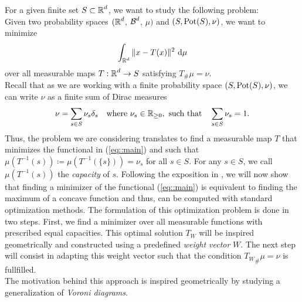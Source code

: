 \documentclass[
     12pt,         %
     a4paper,      %
     BCOR=10mm,     %
     DIV=14,        %
     ]{scrreprt}
\begin{document}
    

    For a given finite set $S \subset \operatorname{\mathbb{R}}^d$, we want to study the following problem: \\ 
    Given two probability spaces $(\operatorname{\mathbb{R}}^d$, $\operatorname{\mathcal{B}}^d$, $\mu)$ and $(S, \operatorname{Pot}(S), \nu)$, we want to minimize 
    \begin{align} \label{eq::main}
        \int_{\operatorname{\mathbb{R}}^d} \|x-T(x) \|^2 \ {\operatorname{{\mathrm{d}}}} \mu  
    \end{align}
    over all measurable maps $T: \operatorname{\mathbb{R}}^d \to S$ satisfying $T_{\#}\mu = \nu$. \\%
    Recall that as we are working with a finite probability space $(S, \operatorname{Pot}(S), \nu)$, we can write $\nu$ as a finite sum of Dirac measures
    \begin{align} \label{eq::dirac} 
        \nu = \sum_{s\in S} {\nu_s \delta_{s}} \quad \text{where   } \nu_s \in \operatorname{\mathbb{R}}_{\ge 0}, \text{    such that} \quad \sum_{s \in S}{\nu_s} = 1. 
    \end{align}
    Thus, the problem we are considering translates to find a measurable map $T$ that minimizes the functional in (\ref{eq::main}) and such that 
    $\mu(T^{-1}(s)) \coloneqq \mu(T^{-1}(\{s\})) = \nu_s $  for all $s\in S$. For any $s\in S$, we call $\mu(T^{-1}(s))$  the \textit{capacity} of $s$.
    Following the exposition in \cite{aurenhammer1998minkowski}, we will now show that finding a minimizer of the functional (\ref{eq::main}) is equivalent to finding the maximum of a concave function and
    thus, can be computed with standard optimization methods. The formulation of this optimization problem is done in two steps. 
    First, we find a minimizer over all measurable functions with prescribed equal capacities. This optimal solution $T_W$ will be inspired geometrically and constructed using 
    a predefined \textit{weight vector}  $W$.
    The next step will consist in adapting this weight vector such that the condition ${T_{W}}_{\#}\mu = \nu$ is fullfilled.\\ 
    The motivation behind this approach is inspired geometrically by studying a generalization of \textit{Voroni diagrams}. 
\end{document}
